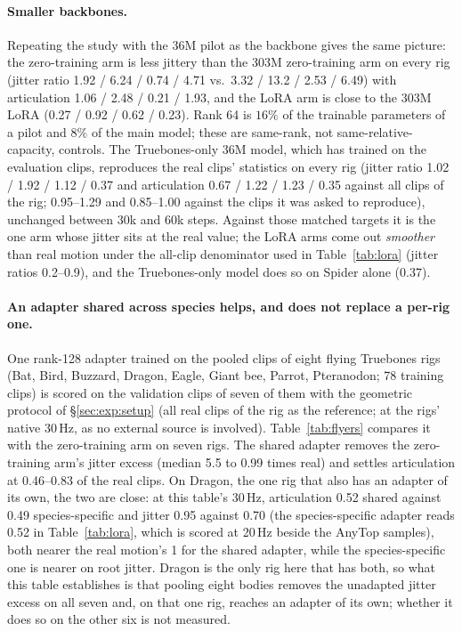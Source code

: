 \paragraph{Smaller backbones.} Repeating the study with the \num{36}M pilot as the backbone gives the
same picture: the zero-training arm is less jittery than the
\num{303}M zero-training arm on every rig (jitter ratio \num{1.92} / \num{6.24} / \num{0.74} /
\num{4.71} vs.\ \num{3.32} / \num{13.2} / \num{2.53} / \num{6.49}) with articulation \num{1.06} /
\num{2.48} / \num{0.21} / \num{1.93}, and the LoRA arm is close to the \num{303}M LoRA (\num{0.27} / \num{0.92} / \num{0.62} /
\num{0.23}). Rank 64 is $16\%$ of
the trainable parameters of a pilot and $8\%$ of the main model; these are same-rank, not
same-relative-capacity, controls. The Truebones-only \num{36}M model, which has trained on the
evaluation clips, reproduces the real clips' statistics on every rig (jitter ratio \num{1.02} /
\num{1.92} / \num{1.12} / \num{0.37} and articulation \num{0.67} / \num{1.22} / \num{1.23} /
\num{0.35} against all clips of the rig; \num{0.95}--\num{1.29} and \num{0.85}--\num{1.00} against
the clips it was asked to reproduce), unchanged between \num{30}k and \num{60}k steps. Against those
matched targets it is the one arm whose jitter sits at the real value; the LoRA arms come out
\emph{smoother} than real motion under the all-clip denominator used in Table~\ref{tab:lora} (jitter
ratios \num{0.2}--\num{0.9}), and the Truebones-only model does so on Spider alone (\num{0.37}).


\paragraph{An adapter shared across species helps, and does not replace a per-rig one.} One rank-128 adapter trained on the pooled clips of eight flying
Truebones rigs (Bat, Bird, Buzzard, Dragon, Eagle, Giant bee, Parrot, Pteranodon; \num{78} training clips) is scored on the
validation clips of seven of them with the geometric protocol of \S\ref{sec:exp:setup} (all real clips of the rig as the reference; at the
rigs' native 30\,Hz, as no external source is involved). Table~\ref{tab:flyers} compares it with the zero-training arm on seven
rigs. The shared adapter removes the zero-training arm's jitter excess (median \num{5.5} to \num{0.99} times real) and settles
articulation at \num{0.46}--\num{0.83} of the real clips. On Dragon, the one rig that also has an adapter of its own, the two are
close: at this table's \num{30}\,Hz, articulation \num{0.52} shared against \num{0.49} species-specific and
jitter \num{0.95} against \num{0.70} (the species-specific adapter reads \num{0.52} in Table~\ref{tab:lora}, which
is scored at \num{20}\,Hz beside the AnyTop samples), both
nearer the real motion's \num{1} for the shared adapter, while the species-specific one is nearer on root jitter.
Dragon is the only rig here that has both, so what this table establishes is that pooling eight bodies removes the
unadapted jitter excess on all seven and, on that one rig, reaches an adapter of its own; whether it does so on the
other six is not measured.

